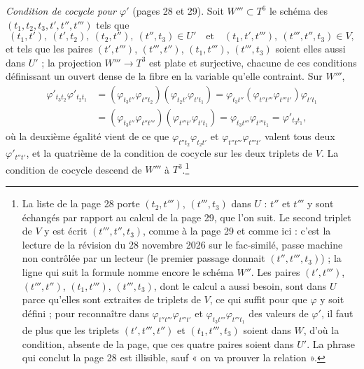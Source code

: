 \documentclass[11pt,a4paper]{article}
\begin{document}
\emph{Condition de cocycle pour $\varphi'$} (pages 28 et 29). Soit $W''' \subset
T^{6}$ le schéma des $(t_1, t_2, t_3, t', t'', t''')$ tels que
\[
  (t_1, t'),\ (t', t_2),\ (t_2, t''),\ (t'', t_3) \in U'
  \quad \text{et} \quad
  (t_1, t', t'''),\ (t''', t'', t_3) \in V ,
\]
et tels que les paires $(t', t''')$, $(t''', t'')$, $(t_1, t''')$, $(t''', t_3)$
soient elles aussi dans $U'$ ; la projection $W''' \to T^{3}$ est plate et
surjective, chacune de ces conditions définissant un ouvert dense de la fibre
en la variable qu'elle contraint. Sur $W'''$,
\begin{align*}
  \varphi'_{t_3 t_2}\varphi'_{t_2 t_1}
  &= (\varphi_{t_3 t''}\varphi_{t'' t_2})(\varphi_{t_2 t'}\varphi_{t' t_1})
   = \varphi_{t_3 t''}(\varphi_{t'' t'''}\varphi_{t''' t'})\varphi_{t' t_1} \\
  &= (\varphi_{t_3 t''}\varphi_{t'' t'''})(\varphi_{t''' t'}\varphi_{t' t_1})
   = \varphi_{t_3 t'''}\varphi_{t''' t_1} = \varphi'_{t_3 t_1} ,
\end{align*}
où la deuxième égalité vient de ce que $\varphi_{t'' t_2}\varphi_{t_2 t'}$ et
$\varphi_{t'' t'''}\varphi_{t''' t'}$ valent tous deux $\varphi'_{t'' t'}$, et
la quatrième de la condition de cocycle sur les deux triplets de $V$. La
condition de cocycle descend de $W'''$ à $T^{3}$.\footnote{La liste de la
page 28 porte $(t_2, t''')$, $(t''', t_3)$ dans $U$ : $t''$ et $t'''$ y sont
échangés par rapport au calcul de la page 29, que
l'on suit. Le second triplet de $V$ y est écrit $(t''', t'', t_3)$, comme à la
page 29 et comme ici : c'est la lecture de la révision du 28 novembre 2026 sur le fac-similé, passe machine non contrôlée par un lecteur (le premier passage donnait
$(t'', t''', t_3)$) ; la ligne qui suit la formule nomme encore le schéma
$W''$. Les paires $(t', t''')$, $(t''', t'')$, $(t_1, t''')$, $(t''',
t_3)$, dont le calcul a aussi besoin, sont dans $U$ parce qu'elles sont
extraites de triplets de $V$, ce qui suffit pour que $\varphi$ y soit défini ;
pour reconnaître dans $\varphi_{t'' t'''}\varphi_{t''' t'}$ et $\varphi_{t_3
t'''}\varphi_{t''' t_1}$ des valeurs de $\varphi'$, il faut de plus que les
triplets $(t', t''', t'')$ et $(t_1, t''', t_3)$ soient dans $W$, d'où la
condition, absente de la page, que ces quatre paires soient dans $U'$. La phrase qui conclut la page 28 est
illisible, sauf « on va prouver la relation ».}
\end{document}
